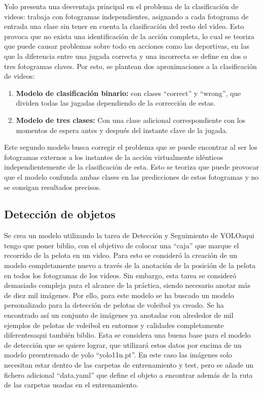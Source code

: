 \documentclass[12pt]{report} %
\begin{document}
    Yolo presenta una desventaja principal en el problema de la clasificación
    de videos: trabaja con fotogramas independientes, asignando a cada
    fotograma de entrada una clase sin tener en cuenta la clasificación del
    resto del video. Esto provoca que no exista una identificación de la acción
    completa, lo cual se teoriza que puede causar problemas sobre todo en
    acciones como las deportivas, en las que la diferencia entre una jugada
    correcta y una incorrecta se define en dos o tres fotogramas claves. Por
    esto, se plantean dos aproximaciones a la clasificación de videos:

    \begin{enumerate}
        \item \textbf{Modelo de clasificación binario:} con clases ``correct'' y ``wrong'', que dividen todas las jugadas dependiendo de la corrección de estas.
        \item \textbf{Modelo de tres clases:} Con una clase adicional correspondiente con los momentos de espera antes y después del instante clave de la jugada.
    \end{enumerate}
    Este segundo modelo busca corregir el problema que se puede encontrar al ser los fotogramas externos a los instantes de la acción virtualmente idénticos independientemente de la clasificación de esta. Esto se teoriza que puede provocar que el modelo confunda ambas clases en las predicciones de estos fotogramas y no se consigan resultados precisos.
    
    \subsection{Detección de objetos}
    Se crea un modelo utilizando la tarea de Detección y Seguimiento de YOLO{aqui tengo que poner biblio}, con el objetivo de colocar una ``caja'' que marque el recorrido de la pelota en un video. Para esto se consideró la creación de un modelo completamente nuevo a través de la anotación de la posición de la pelota en todos los fotogramas de los videos. Sin embargo, esta tarea se consideró demasiado compleja para el alcance de la práctica, siendo necesario anotar más de diez mil imágenes. 
    Por ello, para este modelo se ha buscado un modelo personalizado para la detección de pelotas de voleibol ya creado. Se ha encontrado así un conjunto de imágenes ya anotadas con alrededor de mil ejemplos de pelotas de voleibol en entornos y calidades completamente diferentes{aqui también biblio}. Esta se considera una buena base para el modelo de detección que se quiere lograr, que utilizará estos datos por encima de un modelo preentrenado de yolo ``yolo11n.pt''. En este caso las imágenes solo necesitan estar dentro de las carpetas de entrenamiento y test, pero se añade un fichero adicional ``data.yaml'' que define el objeto a encontrar además de la ruta de las carpetas usadas en el entrenamiento. 
    
\end{document}
